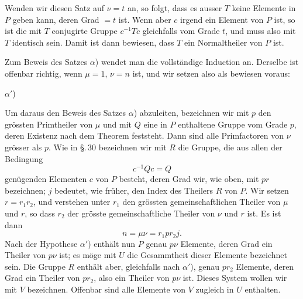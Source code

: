 
Wenden wir diesen Satz auf $\nu = t$ an, so folgt, dass es ausser $T$ keine Elemente in $P$ geben kann, deren Grad $= t$ ist. Wenn aber $c$ irgend ein Element von $P$ ist, so ist die mit $T$ conjugirte Gruppe $c^{-1}Tc$ gleichfalls vom Grade $t$, und muss also mit $T$ identisch sein. Damit ist dann bewiesen, dass $T$ ein Normaltheiler von $P$ ist.

Zum Beweis des Satzes $\alpha$) wendet man die vollständige Induction an. Derselbe ist offenbar richtig, wenn $\mu = 1$, $\nu = n$ ist, und wir setzen also als bewiesen voraus:

$\alpha'$) 

Um daraus den Beweis des Satzes $\alpha$) abzuleiten, bezeichnen wir mit $p$ den grössten Primtheiler von $\mu$ und mit $Q$ eine in $P$ enthaltene Gruppe vom Grade $p$, deren Existenz nach dem  Theorem feststeht. Dann sind alle Primfactoren von $\nu$ grösser als $p$. Wie in \S.\,30 bezeichnen wir mit $R$ die Gruppe, die aus allen der Bedingung
\[
c^{-1}Qc = Q
\]
genügenden Elementen $c$ von $P$ besteht, deren Grad wir, wie oben, mit $pr$ bezeichnen; $j$ bedeutet, wie früher, den Index des Theilers $R$ von $P$. Wir setzen $r = r_1 r_2$, und verstehen unter $r_1$ den grössten gemeinschaftlichen Theiler von $\mu$ und $r$, so dass $r_2$ der grösste gemeinschaftliche Theiler von $\nu$ und $r$ ist. Es ist dann
\[
n = \mu\nu = r_1 p r_2 j.
\]
Nach der Hypothese $\alpha'$) enthält nun $P$ genau $p\nu$ Elemente, deren Grad ein Theiler von $p\nu$ ist; es möge mit $U$ die Gesammtheit dieser Elemente bezeichnet sein. Die Gruppe $R$ enthält aber, gleichfalls nach $\alpha'$), genau $pr_2$ Elemente, deren Grad ein Theiler von $pr_2$, also ein Theiler von $p\nu$ ist. Dieses System wollen wir mit $V$ bezeichnen. Offenbar sind alle Elemente von $V$ zugleich in $U$ enthalten.
